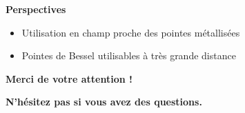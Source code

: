 \documentclass[9pt,a9paper,handout]{beamer}
\begin{document}
\begin{frame}
    \vspace*{5mm}
    {\large \textbf{Perspectives}} \vspace*{1mm}
    \begin{itemize}
        \item Utilisation en champ proche des pointes métallisées
        \item Pointes de Bessel utilisables à très grande distance
    \end{itemize}
\end{frame}

\begin{frame}
    \begin{LARGE}
    \begin{center}
    \textbf{Merci de votre attention !}
    \vspace{0.5cm}
    
    \textbf{N'hésitez pas si vous avez des questions.}
    \end{center}
    \end{LARGE}
\end{frame}
\end{document}
